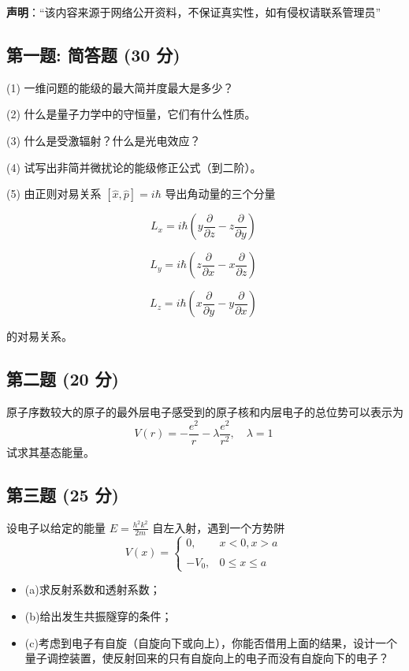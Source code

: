 
\textbf{声明}：“该内容来源于网络公开资料，不保证真实性，如有侵权请联系管理员”

\subsection{第一题: 简答题 (30 分)}

(1) 一维问题的能级的最大简并度最大是多少？

(2) 什么是量子力学中的守恒量，它们有什么性质。

(3) 什么是受激辐射？什么是光电效应？

(4) 试写出非简并微扰论的能级修正公式（到二阶）。

(5) 由正则对易关系 $[\hat{x}, \hat{p}] = i\hbar$ 导出角动量的三个分量

\[L_x = i \hbar \left( y \frac{\partial}{\partial z} - z \frac{\partial}{\partial y} \right)~\]

\[L_y = i \hbar \left( z \frac{\partial}{\partial x} - x \frac{\partial}{\partial z} \right)~\]

\[L_z = i \hbar \left( x \frac{\partial}{\partial y} - y \frac{\partial}{\partial x} \right)~\]

的对易关系。
\subsection{第二题 (20 分)}
原子序数较大的原子的最外层电子感受到的原子核和内层电子的总位势可以表示为
\[V(r) = -\frac{e^2}{r} - \lambda \frac{e^2}{r^2}, \quad \lambda = 1~\]
试求其基态能量。
\subsection{第三题 (25 分)}
设电子以给定的能量 $E = \frac{h^2 k^2}{2m}$ 自左入射，遇到一个方势阱
\[V(x) = \begin{cases} 0, & x < 0, x > a \\\\-V_0, & 0 \leq x \leq a \end{cases}~\]
\begin{itemize}
  \item (a)求反射系数和透射系数；
  \item (b)给出发生共振隧穿的条件；
  \item (c)考虑到电子有自旋（自旋向下或向上），你能否借用上面的结果，设计一个量子调控装置，使反射回来的只有自旋向上的电子而没有自旋向下的电子？
\end{itemize}
